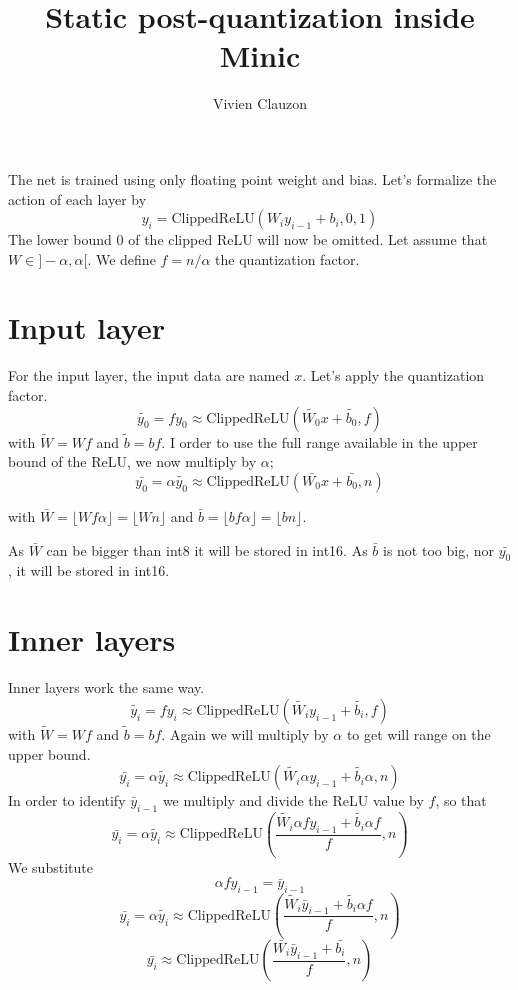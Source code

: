 \documentclass{article}
\begin{document}
\title{Static post-quantization inside Minic}
\author{Vivien Clauzon}

\maketitle
The net is trained using only floating point weight and bias.
Let's formalize the action of each layer by
$$y_i = \text{ClippedReLU}(W_i y_{i-1} + b_i , 0, 1)$$
The lower bound 0 of the clipped ReLU will now be omitted.
Let assume that $W \in ]-\alpha, \alpha[$.
We define $f = n/\alpha$ the quantization factor.

\section{Input layer}

For the input layer, the input data are named $x$. Let's apply the quantization factor.
$$\tilde{y_0} = fy_0 \approx \text{ClippedReLU}(\tilde{W_0} x + \tilde{b_0} , f)$$
with $\tilde{W} = Wf$ and $\tilde{b} = bf$.
I order to use the full range available in the upper bound of the ReLU, we now multiply by $\alpha$; 
$$\bar{y_0} = \alpha \tilde{y_0} \approx \text{ClippedReLU}(\bar{W_0} x + \bar{b_0} , n)$$

with $\bar{W} = \lfloor Wf\alpha \rfloor = \lfloor Wn \rfloor$ and $\bar{b} = \lfloor bf\alpha \rfloor = \lfloor bn \rfloor $.

As $\bar{W}$ can be bigger than int8 it will be stored in int16.
As $\bar{b}$ is not too big, nor $\bar{y_0}$, it will be stored in int16.

\section{Inner layers}
Inner layers work the same way.
$$\tilde{y_i} = fy_i \approx \text{ClippedReLU}(\tilde{W_i} y_{i-1} + \tilde{b_i} , f)$$
with $\tilde{W} = Wf$ and $\tilde{b} = bf$. Again we will multiply by $\alpha$ to get will range on the upper bound.
$$\bar{y_i} = \alpha \tilde{y_i} \approx \text{ClippedReLU}(\tilde{W_i} \alpha y_{i-1} + \tilde{b_i}\alpha , n)$$
In order to identify $\bar{y}_{i-1}$ we multiply and divide the ReLU value by $f$, so that
$$\bar{y_i} = \alpha \tilde{y_i} \approx \text{ClippedReLU}\left(\frac{\tilde{W_i} \alpha f y_{i-1} + \tilde{b_i}\alpha f}{f}, n\right)$$
We substitute
$$ \alpha f y_{i-1} = \bar{y}_{i-1}$$
$$\bar{y_i} = \alpha \tilde{y_i} \approx \text{ClippedReLU}\left(\frac{\tilde{W_i} \bar{y}_{i-1} + \tilde{b_i}\alpha f}{f}, n\right)$$
$$\bar{y_i} \approx \text{ClippedReLU}\left(\frac{\bar{W_i} \bar{y}_{i-1} + \bar{b_i}}{f}, n\right)$$
\end{document}
